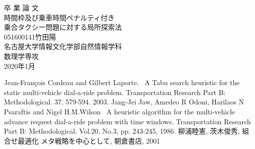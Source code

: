 \documentclass[uplatex]{ujreport}
\begin{document}
\begin{table}[b]
\begin{center}
{\huge 卒\hspace{0.1cm} 業\hspace{0.1cm} 論\hspace{0.1cm} 文}\\[2.5cm]
{\huge 時間枠及び乗車時間ペナルティ付き\\乗合タクシー問題に対する局所探索法}\\[6cm]
{\huge 051600141\qquad 竹田陽}\\[1cm]
{\huge 名古屋大学情報文化学部自然情報学科}\\[0.5cm]
{\huge 数理学専攻}\\[0.5cm]
{\huge 2020年1月}\\
\end{center}
\end{table}


\thispagestyle{empty}
\clearpage
\newpage
{}
\setcounter{page}{1}







\thispagestyle{empty}
\tableofcontents
\newpage
\setcounter{page}{1}
\pagestyle{plain}
















\begin{thebibliography}{99}
  Jean-François Cordeau and Gilbert Laporte.  \, A Tabu search heuristic for the static multi-vehicle dial-a-ride problem. Transportation Research Part B: Methodological. 37. 579-594. 2003.
  Jang-Jei Jaw, Amedeo R Odoni, Harilaos N Psaraftis and Nigel H.M.Wilson \, A heuristic algorithm for the multi-vehicle advance request dial-a-ride problem with time windows. Transportation Research Part B: Methodological. Vol.20, No.3, pp. 243-245, 1986.
  柳浦睦憲, 茨木俊秀, 組合せ最適化 メタ戦略を中心として, 朝倉書店, 2001
\end{thebibliography}
\end{document}
